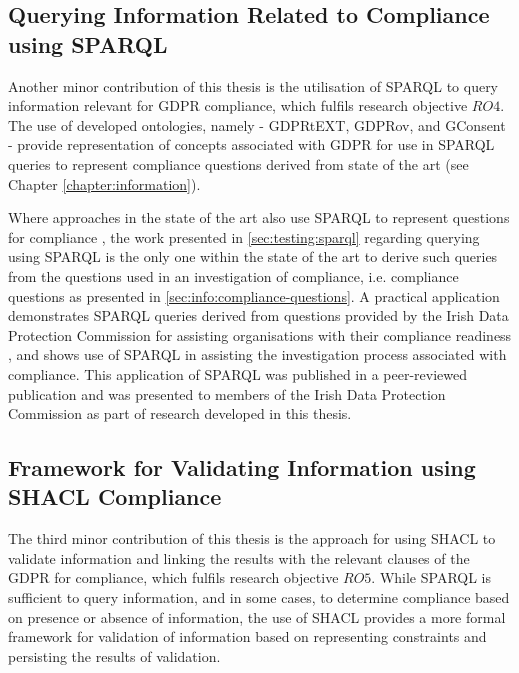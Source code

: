 \subsection{Querying Information Related to Compliance using SPARQL}\label{sec:contributions:querying}
Another minor contribution of this thesis is the utilisation of SPARQL to query  information relevant for GDPR compliance, which fulfils research objective $RO4$.
The use of developed ontologies, namely - GDPRtEXT, GDPRov, and GConsent - provide representation of concepts associated with GDPR for use in SPARQL queries to represent compliance questions derived from state of the art (see Chapter \ref{chapter:information}).

Where approaches in the state of the art also use SPARQL to represent questions for compliance \cite{agarwal_legislative_2018,palmirani_pronto_2018}, the work presented in \autoref{sec:testing:sparql} regarding querying using SPARQL is the only one within the state of the art to derive such queries from the questions used in an investigation of compliance, i.e. compliance questions as presented in \autoref{sec:info:compliance-questions}.
A practical application demonstrates SPARQL queries derived from questions provided by the Irish Data Protection Commission for assisting organisations with their compliance readiness \cite{GDPR_readiness_checklist}, and shows use of SPARQL in assisting the investigation process associated with compliance.
This application of SPARQL was published in a peer-reviewed publication \cite{pandit_queryable_2018} and was presented to members of the Irish Data Protection Commission as part of research developed in this thesis.

\subsection{Framework for Validating Information using SHACL Compliance}\label{sec:contributions:validation}
The third minor contribution of this thesis is the approach for using SHACL to validate information and linking the results with the relevant clauses of the GDPR for compliance, which fulfils research objective $RO5$.
While SPARQL is sufficient to query information, and in some cases, to determine compliance based on presence or absence of information, the use of SHACL provides a more formal framework for validation of information based on representing constraints and persisting the results of validation.

